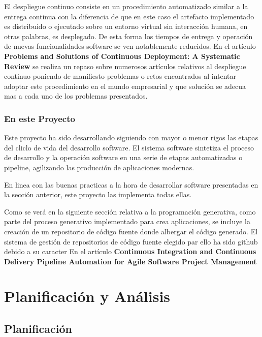 \documentclass[a4paper,11pt]{book}
\begin{document}
El despliegue continuo consiste en un procedimiento automatizado similar a la entrega continua con la diferencia de que en este caso el artefacto implementado es distribuido o ejecutado sobre un entorno virtual sin interacción humana, en otras palabras, es desplegado.  De esta forma los tiempos de entrega y operación de nuevas funcionalidades software se ven notablemente reducidos. En el artículo \textbf{Problems and Solutions of Continuous Deployment: A Systematic Review}\cite{cdpl} se realiza un repaso sobre numerosos artículos relativos al despliegue continuo  poniendo de manifiesto problemas o retos encontrados al intentar adoptar este procedimiento en el mundo empresarial y que  
solución se adecua mas a cada uno de los problemas presentados. 

\subsection{En este Proyecto}

Este proyecto ha sido desarrollando siguiendo con mayor o menor rigos las etapas del cliclo de vida del desarrollo software. El sistema software  sintetiza el proceso de desarrollo y la operación software  en una serie de etapas automatizadas o pipeline, agilizando  las producción de aplicaciones modernas.

En linea con las buenas practicas a la hora de desarrollar software presentadas en la sección anterior, este proyecto las implementa todas ellas. 


Como se verá en la siguiente sección relativa a la programación generativa, como parte del proceso generativo implementado para crea aplicaciones, se incluye la creación de un repositorio de código fuente donde albergar el código generado. El sistema de gestión de repositorios de código fuente elegido par ello ha sido github debido a su caracter 
En el artículo \textbf{Continuous Integration and Continuous Delivery Pipeline Automation for Agile Software Project Management}\cite{ci}





\chapter{Planificación y Análisis}

\section{Planificación}
\end{document}
